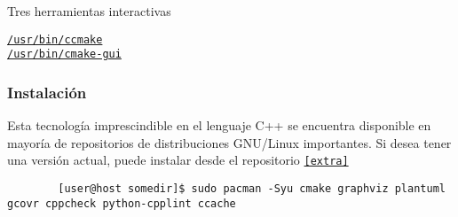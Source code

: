 \begin{frame}[fragile]
	Tres herramientas interactivas

	\begin{description}
		\item[\href{https://man.archlinux.org/man/ccmake.1}{\lstinline{/usr/bin/ccmake}}]

		\item[\href{https://man.archlinux.org/man/cmake-gui.1}{\lstinline{/usr/bin/cmake-gui}}]
	\end{description}

\end{frame}

\begin{frame}
	\frametitle{Instalación}
	Esta tecnología imprescindible en el lenguaje C++ se encuentra
	disponible en mayoría de repositorios de distribuciones
	GNU/Linux importantes.
	Si desea tener una versión actual, puede instalar desde el
	repositorio \href{https://archlinux.org/packages/extra/x86_64/cmake}{\lstinline{[extra]}}

	\begin{verbatim}
		[user@host somedir]$ sudo pacman -Syu cmake graphviz plantuml gcovr cppcheck python-cpplint ccache
	\end{verbatim}

\end{frame}

